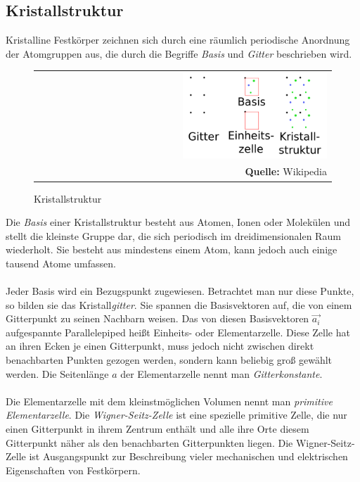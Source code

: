 \documentclass[a4paper,titlepage]{scrartcl}
\numberwithin{equation}{section}
\begin{document}
\subsection{Kristallstruktur}
Kristalline Festkörper zeichnen sich durch eine räumlich periodische Anordnung der Atomgruppen aus, die durch die Begriffe \emph{Basis} und \emph{Gitter} beschrieben wird.
\begin{figure}[H]
	\centering
	\begin{tabular}{@{}r@{}}
		\includegraphics[width=0.5\textwidth]{kristallstruktur.png}\\
		\footnotesize\sffamily\textbf{Quelle:} Wikipedia \cite{wiki:kristallstruktur}
	\end{tabular}
	\caption{Kristallstruktur}
    \label{fig:kristallstruktur}
\end{figure}
Die \emph{Basis} einer Kristallstruktur besteht aus Atomen, Ionen oder Molekülen und stellt die kleinste Gruppe dar, die sich periodisch im dreidimensionalen Raum wiederholt. Sie besteht aus mindestens einem Atom, kann jedoch auch einige tausend Atome umfassen.\\ \\
Jeder Basis wird ein Bezugspunkt zugewiesen. Betrachtet man nur diese Punkte, so bilden sie das Kristall\emph{gitter}. Sie spannen die Basisvektoren auf, die von einem Gitterpunkt zu seinen Nachbarn weisen. Das von diesen Basisvektoren $\vec{a_i}$ aufgespannte Parallelepiped heißt Einheits- oder Elementarzelle. Diese Zelle hat an ihren Ecken je einen Gitterpunkt, muss jedoch nicht zwischen direkt benachbarten Punkten gezogen werden, sondern kann beliebig groß gewählt werden. \cite{wiki:kristallstruktur} Die Seitenlänge $a$ der Elementarzelle nennt man \emph{Gitterkonstante}.\\ \\
Die Elementarzelle mit dem kleinstmöglichen Volumen nennt man \emph{primitive Elementarzelle}. Die \emph{Wigner-Seitz-Zelle} ist eine spezielle primitive Zelle, die nur einen Gitterpunkt in ihrem Zentrum enthält und alle ihre Orte diesem Gitterpunkt näher als den benachbarten Gitterpunkten liegen. Die Wigner-Seitz-Zelle ist Ausgangspunkt zur Beschreibung vieler mechanischen und elektrischen Eigenschaften von Festkörpern. \cite{wiki:wignerseitz}\\ \\
\end{document}
